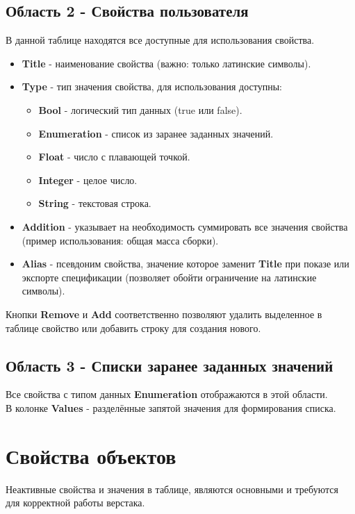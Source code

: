 \documentclass[a4paper,12pt]{article}
\begin{document}
\pagebreak

\subsection{Область 2 - Свойства пользователя}
В данной таблице находятся все доступные для использования свойства.
\begin{itemize}
	\item \textbf{Title} - наименование свойства (важно: только латинские символы).
	\item \textbf{Type} - тип значения свойства, для использования доступны:
	\begin{itemize}
		\item \textbf{Bool} - логический тип данных (true или false).
		\item \textbf{Enumeration} - список из заранее заданных значений.
		\item \textbf{Float} - число с плавающей точкой.
		\item \textbf{Integer} - целое число.
		\item \textbf{String} - текстовая строка.
	\end{itemize}
	\item \textbf{Addition} - указывает на необходимость суммировать все значения свойства\\(пример использования: общая масса сборки).
	\item \textbf{Alias} - псевдоним свойства, значение которое заменит \textbf{Title} при показе или\\ экспорте спецификации (позволяет обойти ограничение на латинские символы).
\end{itemize}

\begin{flushleft}Кнопки \textbf{Remove} и \textbf{Add} соответственно позволяют удалить выделенное в таблице свойство или добавить строку для создания нового.\end{flushleft}


\subsection{Область 3 - Списки заранее заданных значений}
Все свойства с типом данных \textbf{Enumeration} отображаются в этой области.\\В колонке \textbf{Values} - разделённые запятой значения для формирования списка.



\section{Свойства объектов}
Неактивные свойства и значения в таблице, являются основными и требуются для корректной работы верстака.
\end{document}
